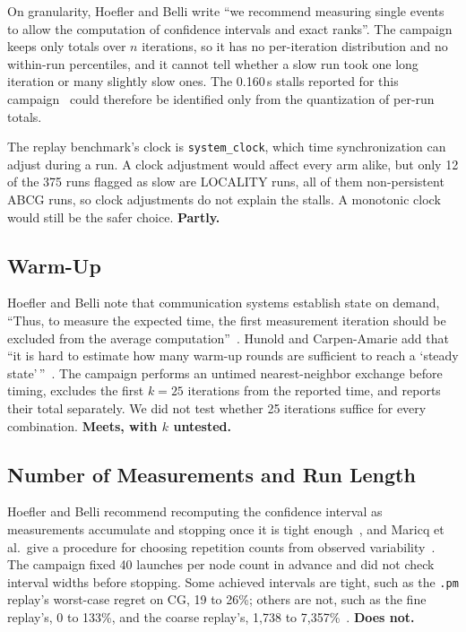 \documentclass[11pt]{article}
\newcommand{\verdict}[1]{\textbf{#1}}
\newcommand{\pmrep}{\texttt{.pm} replay}
\begin{document}
On granularity, Hoefler and Belli write ``we recommend measuring single events to allow
the computation of confidence intervals and exact ranks''. The campaign keeps only totals
over $n$ iterations, so it has no per-iteration distribution and no within-run
percentiles, and it cannot tell whether a slow run took one long iteration or many
slightly slow ones. The 0.160\,s stalls reported for this campaign~\cite{fivewayreport}
could therefore be identified only from the quantization of per-run totals.

The replay benchmark's clock is \texttt{system\_clock}, which time synchronization can
adjust during a run. A clock adjustment would affect every arm alike, but only 12 of the
375 runs flagged as slow are LOCALITY runs, all of them non-persistent ABCG runs, so clock adjustments do not explain the
stalls. A monotonic clock would still be the safer choice. \verdict{Partly.}

\subsection{Warm-Up}

Hoefler and Belli note that communication systems establish state on demand, ``Thus, to
measure the expected time, the first measurement iteration should be excluded from the
average computation''~\cite[Section~4.1.2]{hoefler2015scientific}. Hunold and
Carpen-Amarie add that ``it is hard to estimate how many warm-up rounds are sufficient to
reach a `steady state'\,''~\cite[Section~3.3]{hunold2016reproducible}. The campaign
performs an untimed nearest-neighbor exchange before timing, excludes the first $k=25$
iterations from the reported time, and reports their total separately. We did not test
whether 25 iterations suffice for every combination. \verdict{Meets, with $k$
untested.}

\subsection{Number of Measurements and Run Length}

Hoefler and Belli recommend recomputing the confidence interval as measurements
accumulate and stopping once it is tight enough~\cite[Section~4.2.2]{hoefler2015scientific},
and Maricq et al.\ give a procedure for choosing repetition counts from observed
variability~\cite{maricq2018taming}. The campaign fixed 40 launches per node count in
advance and did not check interval widths before stopping. Some achieved intervals are
tight, such as the \pmrep's worst-case regret on CG, 19 to 26\%; others are not, such as
the fine replay's, 0 to 133\%, and the coarse replay's, 1,738 to
7,357\%~\cite{fivewayreport}. \verdict{Does not.}
\end{document}
